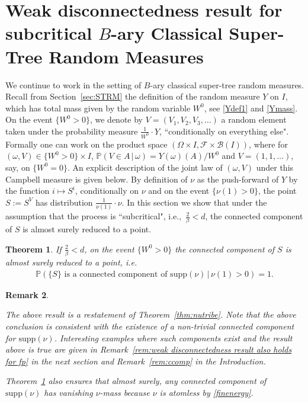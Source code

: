 \documentclass[12pt]{article}
\newtheorem{theorem}{Theorem}
\numberwithin{theorem}{section}
\newtheorem{remark}[theorem]{Remark}
\theoremstyle{def}
\numberwithin{equation}{section}
\renewcommand{\P}{\mathbb{P}}
\newcommand{\cB}{\mathcal B}
\newcommand{\cF}{\mathcal F}
\newcommand{\supp}{\mathrm{supp}}
\begin{document}
\section{Weak disconnectedness result for subcritical $B$-ary Classical Super-Tree Random Measures}
\label{sec:wdisc}
We continue to work in the setting of $B$-ary classical super-tree random measures. Recall from Section~\ref{sec:STRM} the definition of the random measure $Y$ on $I$, which has total mass given by the random variable $W^0$, see \eqref{Ydef1} and \eqref{Ymass}.
%
On the event $\{W^0>0\}$, we denote by $V = (V_1,V_2,V_3,\dots )$ a random element taken under the probability measure $\frac{1}{W^0}\cdot Y$, ``conditionally on everything else". Formally one can work on the product space $(\Omega\times I, \cF\times \cB(I))$, where for $(\omega,V)\in\{W^0>0\}\times I$, $\P(V\in A \, | \, \omega)=Y(\omega)(A)/W^0$ and $V=(1,1,\dots)$, say, on $\{W^0=0\}$. 
An explicit description of the joint law of $(\omega,V)$ under this Campbell measure is given below. 
By definition of $\nu$ as the push-forward of $Y$ by the function $i\mapsto S^i$, conditionally on $\nu$ and on the event $\{\nu(1)>0\}$, the point $S:=S^V$ has distribution $\frac{1}{\nu(1)}\cdot \nu$. 
In this section we show that under the assumption that the process is ``subcritical", i.e.,\ $\frac{2}{\beta} <d$, the connected component of $S$ is almost surely reduced to a point.
\begin{theorem}\label{thm:weak disconnectedness}
If $\frac{2}{\beta} <d$, on the event $\{W^0> 0\}$ the connected component of $S$ is almost surely reduced to a point, i.e.
\begin{align*}
	\P\left( \{S\} \text{ is a connected component of }\supp(\nu)\, | \, \nu(1)>0\right) = 1.
\end{align*}
\end{theorem}
\begin{remark}\label{rem:Wdisc}
	\begin{enumerate*}[label=\emph{(\alph*)}, ref=(\alph*),leftmargin=*]
	\item 
	The above result is a restatement of Theorem~\ref{thm:nutribe}.
	Note that the above conclusion is consistent with the existence of a non-trivial connected component for $\supp(\nu)$. Interesting examples where such components exist and the result above is true are given in Remark~\ref{rem:weak disconnectedness result also holds for fp} in the next section and Remark~\ref{rem:ccomp} in the Introduction. \\
	\item Theorem~\ref{thm:weak disconnectedness}  also ensures that almost surely, any connected component of $\supp(\nu)$ has vanishing $\nu$-mass because $\nu$ is atomless by \eqref{finenergy}.
	\end{enumerate*}
\end{remark}
\end{document}
